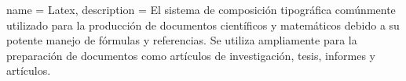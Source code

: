 {
    name = Latex,
    description = {El sistema de composición tipográfica comúnmente utilizado para la producción de documentos científicos y matemáticos debido a su potente manejo de fórmulas y referencias. Se utiliza ampliamente para la preparación de documentos como artículos de investigación, tesis, informes y artículos.}
}
